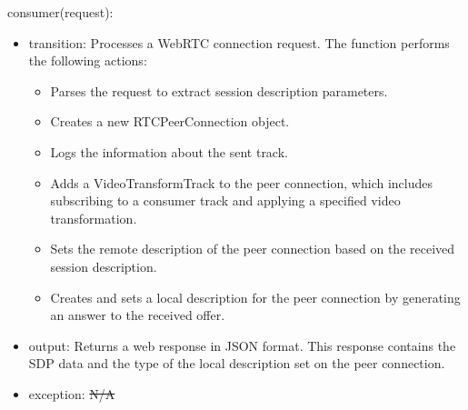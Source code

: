 \documentclass[12pt, titlepage]{article}
\newcommand{\rt}[1]{\textcolor{red}{#1}}
\begin{document}
\noindent consumer(request):
\begin{itemize}
\item transition: Processes a WebRTC connection request. The function performs the
  following actions:
  \begin{itemize}
  \item Parses the request to extract session description parameters.
  \item Creates a new RTCPeerConnection object.
  \item Logs the information about the sent track.
  \item Adds a VideoTransformTrack to the peer connection, which includes subscribing
    to a consumer track and applying a specified video transformation.
  \item Sets the remote description of the peer connection based on the received session description.
  \item Creates and sets a local description for the peer connection by generating an answer to the received offer.
  \end{itemize}
\item output: Returns a web response in JSON format. This response contains the SDP
  data and the type of the local description set on the peer connection.
\item exception: \sout{N/A} \rt{}
\end{itemize}
\end{document}
